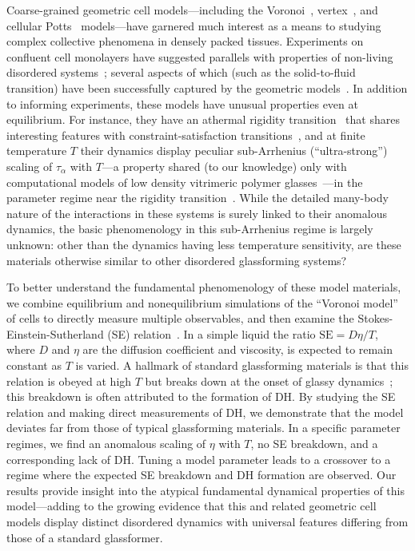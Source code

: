 \documentclass[amsmath,amssymb,prl,reprint,twocolumn]{revtex4-2}
\begin{document}
Coarse-grained geometric cell models---including the Voronoi~\cite{Bi2016}, vertex~\cite{Nagai2001,Farhadifar2007,Bi2015}, and cellular Potts~\cite{Graner1992} models---have garnered much interest as a means to studying complex collective phenomena in densely packed tissues. 
Experiments on confluent cell monolayers have suggested parallels with properties of non-living disordered systems~\cite{Angelini2011,Nnetu2012,Park2015,Park2016,Malinverno2017,Atia2018,Vishwakarma2020,Kim2020,Lin2020,Cerbino2021,Sadhukhan2024Review}; several aspects of which (such as the solid-to-fluid transition) have been successfully captured by the geometric models~\cite{Bi2015,Bi2016,Li2018,Chiang2016,Park2015,Grosser2021}.
In addition to informing experiments, these models have unusual properties even at equilibrium.
For instance, they have an athermal rigidity transition~\cite{Sussman2018SM,Bi2015,Teomy2018,Pinto2022} that shares interesting features with constraint-satisfaction transitions~\cite{Urbani2023}, and at finite temperature $T$ their dynamics display peculiar sub-Arrhenius (``ultra-strong'') scaling of $\tau_{\alpha}$ with $T$---a property shared (to our knowledge) only with computational models of low density vitrimeric polymer glasses~\cite{Ciarella2019}---in the parameter regime near the rigidity transition~\cite{Sussman2018EPL,Li2021,Sadhukhan2021,Li2025}. 
While the detailed many-body nature of the interactions in these systems is surely linked to their anomalous dynamics, the basic phenomenology in this sub-Arrhenius regime is largely unknown: other than the dynamics having less temperature sensitivity, are these materials otherwise similar to other disordered glassforming systems?

To better understand the fundamental phenomenology of these model materials, we combine equilibrium and nonequilibrium simulations of the ``Voronoi model'' of cells to directly measure multiple observables, and then examine the Stokes-Einstein-Sutherland (SE) relation~\cite{Einstein1905,Sutherland1905}.
In a simple liquid the ratio $\text{SE} = D\eta/T$, where $D$ and $\eta$ are the diffusion coefficient and viscosity, is expected to remain constant as $T$ is varied.
A hallmark of standard glassforming materials is that this relation is obeyed at high $T$ but breaks down at the onset of glassy dynamics~\cite{Rossler1990,Hodgdon1993,Ediger2000}; this breakdown is often attributed to the formation of DH.
By studying the SE relation and making direct measurements of DH, we demonstrate that the model deviates far from those of typical glassforming materials.
In a specific parameter regimes, we find an anomalous scaling of $\eta$ with $T$, no SE breakdown, and a corresponding lack of DH.
Tuning a model parameter leads to a crossover to a regime where the expected SE breakdown and DH formation are observed.
Our results provide insight into the atypical fundamental dynamical properties of this model---adding to the growing evidence that this and related geometric cell models display distinct disordered dynamics with universal features differing from those of a standard glassformer.
\end{document}
